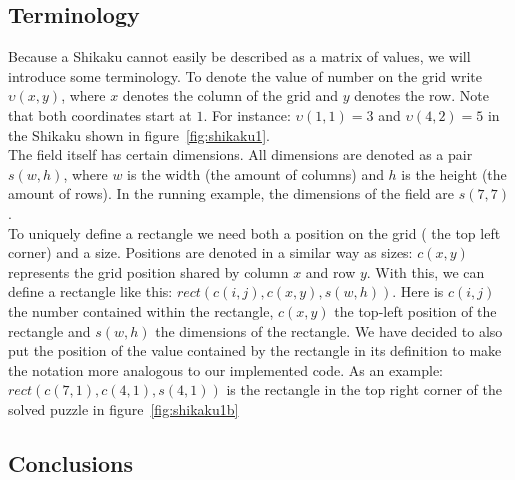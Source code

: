 \subsection{Terminology}
Because a Shikaku cannot easily be described as a matrix of values, we will introduce some terminology. To denote the value of number on the grid write $\upsilon(x,y)$, where $x$ denotes the column of the grid and $y$ denotes the row. Note that both coordinates start at $1$. For instance: $\upsilon(1,1) = 3$ and $\upsilon(4,2) = 5$ in the Shikaku shown in figure~\ref{fig:shikaku1}. 
\\
The field itself has certain dimensions. All dimensions are denoted as a pair $s(w,h)$, where $w$ is the width (the amount of columns) and $h$ is the height (the amount of rows). In the running example, the dimensions of the field are $s(7,7)$. 
\\
To uniquely define a rectangle we need both a position on the grid ( the top left corner) and a size. Positions are denoted in a similar way as sizes: $c(x,y)$ represents the grid position shared by column $x$ and row $y$. With this, we can define a rectangle like this: $rect(c(i,j),c(x,y),s(w,h))$. Here is $c(i,j)$ the number contained within the rectangle, $c(x,y)$ the top-left position of the rectangle and $s(w,h)$ the dimensions of the rectangle. We have decided to also put the position of the value contained by the rectangle in its definition to make the notation more analogous to our implemented code. As an example: $rect(c(7,1),c(4,1),s(4,1))$ is the rectangle in the top right corner of the solved puzzle in figure~\ref{fig:shikaku1b}


\subsection{Conclusions}


